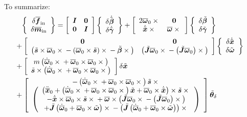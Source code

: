 \documentclass[10pt,dvips,fleqn,subeqn]{report}
\newcommand{\T}[1]{\bm{#1}}
\newcommand{\TT}[1]{\bm{#1}}
\begin{document}
To summarize:
\begin{align}
	\cubr{\cvvect{
		\delta\overline{\T{f}}_{\text{in}} \\
		\delta\overline{\T{m}}_{\text{in}}
	}} &= \sqbr{\matr{cc}{
		\TT{I} & \TT{0} \\
		\TT{0} & \TT{I}
	}} \cubr{\cvvect{
		\delta\dot{\tilde{\T{\beta}}} \\
		\delta\dot{\tilde{\T{\gamma}}}
	}} + \sqbr{\matr{cc}{
		2 \overline{\T{\omega}}_0 \times{} & \TT{0} \\
		\dot{\tilde{\T{x}}} \times{} & \overline{\T{\omega}} \times{}
	}} \cubr{\cvvect{
		\delta\tilde{\T{\beta}} \\
		\delta\tilde{\T{\gamma}}
	}}
	\nonumber \\ & \hspace{-20mm}
	+ \sqbr{\matr{cc}{
		\TT{0} & \TT{0} \\
		\plbr{
			\tilde{\T{s}} \times \overline{\T{\omega}}_0 \times{}
			- \plbr{\overline{\T{\omega}}_0 \times \tilde{\T{s}}} \times{}
			- \tilde{\T{\beta}} \times{}
		}
		& \plbr{
			\tilde{\TT{J}} \overline{\T{\omega}}_0 \times{}
			- \plbr{\tilde{\TT{J}} \overline{\T{\omega}}_0} \times{}
		}
	}} \cubr{\cvvect{
		\delta\dot{\tilde{\T{x}}} \\
		\delta\tilde{\T{\omega}}
	}}
	\nonumber \\ & \hspace{-20mm}
	+ \sqbr{\matr{c}{
		m \plbr{
			\dot{\overline{\T{\omega}}}_0 \times{}
			+ \overline{\T{\omega}}_0 \times \overline{\T{\omega}}_0 \times{}
		} \\
		\tilde{\T{s}} \times \plbr{
			\dot{\overline{\T{\omega}}}_0 \times{}
			+ \overline{\T{\omega}}_0 \times \overline{\T{\omega}}_0 \times{}
		}
	}} \delta\tilde{\T{x}}
	\nonumber \\ & \hspace{-20mm}
	+ \sqbr{\matr{c}{
		- \plbr{
			\dot{\overline{\T{\omega}}}_0 \times{}
			+ \overline{\T{\omega}}_0 \times \overline{\T{\omega}}_0 \times{}
		} \tilde{\T{s}} \times{} \\
		\plbr{\cvvect{
			\plbr{
				\ddot{\overline{\T{x}}}_0
				+ \plbr{
					\dot{\overline{\T{\omega}}}_0 \times{}
					+ \overline{\T{\omega}}_0 \times \overline{\T{\omega}}_0 \times{}
				} \tilde{\T{x}}
				+ \overline{\T{\omega}}_0 \times \dot{\tilde{\T{x}}}
			} \times \tilde{\T{s}} \times{} \\
			- \dot{\tilde{\T{x}}} \times \overline{\T{\omega}}_0 \times \tilde{\T{s}} \times{}
			+ \overline{\T{\omega}} \times \plbr{
				\tilde{\TT{J}} \overline{\T{\omega}}_0 \times{}
				- \plbr{\tilde{\TT{J}} \overline{\T{\omega}}_0} \times{}
			} \\
			+ \tilde{\TT{J}} \plbr{
				\dot{\overline{\T{\omega}}}_0
				+ \overline{\T{\omega}}_0 \times \tilde{\T{\omega}}
			} \times{}
			- \plbr{\tilde{\TT{J}} \plbr{
				\dot{\overline{\T{\omega}}}_0
				+ \overline{\T{\omega}}_0 \times \tilde{\T{\omega}}
			}} \times{}
		}}
	}} \tilde{\T{\theta}}_{\delta}
\end{align}
\end{document}
